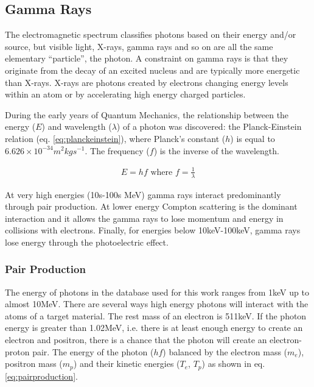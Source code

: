 \FloatBarrier
\subsection{Gamma Rays}

The electromagnetic spectrum classifies photons based on their energy and/or source, but visible light, X-rays, gamma rays and so on are all the same elementary \enquote{particle}, the photon.  A constraint on gamma rays is that they originate from the decay of an excited nucleus and are typically more energetic than X-rays.  X-rays are photons created by electrons changing energy levels within an atom or by accelerating high energy charged particles. 

During the early years of Quantum Mechanics, the relationship between the energy ($E$) and wavelength ($\lambda$) of a photon was discovered: the Planck-Einstein relation (eq. \ref{eq:planckeinstein}), where Planck's constant ($h$) is equal to $6.626 \times 10^{-34} m^2 kg s^{-1}$.  The frequency ($f$) is the inverse of the wavelength.

\begin{equation}
\begin{split}
E = h f \text{   where   } f = \frac{1}{\lambda}
\end{split}
\label{eq:planckeinstein}
\end{equation}

At very high energies (10s-100s MeV) gamma rays interact predominantly through pair production.  At lower energy Compton scattering is the dominant interaction and it allows the gamma rays to lose momentum and energy in collisions with electrons.  Finally, for energies below 10keV-100keV, gamma rays lose energy through the photoelectric effect.

\subsubsection{Pair Production}

The energy of photons in the database used for this work ranges from 1keV up to almost 10MeV.  There are several ways high energy photons will interact with the atoms of a target material.  The rest mass of an electron is 511keV.  If the photon energy is greater than 1.02MeV, i.e. there is at least enough energy to create an electron and positron, there is a chance that the photon will create an electron-proton pair. The energy of the photon ($h f$) balanced by the electron mass ($m_e$), positron mass ($m_p$) and their kinetic energies ($T_e$, $T_p$) as shown in eq. \ref{eq:pairproduction}.

